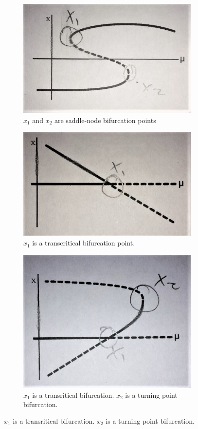 \documentclass[12pt,a4paper]{article}
\begin{document}
\begin{figure}[H]
\centering
\begin{subfigure}{.3\textwidth}
    \centering
    \includegraphics[width=.8\linewidth]{q3-a}
    \caption{$x_1$ and $x_2$ are saddle-node bifurcation points}
\end{subfigure}
\begin{subfigure}{.3\textwidth}
    \centering
    \includegraphics[width=.8\linewidth]{q3-b}
    \caption{$x_1$ is a transcritical bifurcation point.}
\end{subfigure}
\begin{subfigure}{.3\textwidth}
    \centering
    \includegraphics[width=.8\linewidth]{q3-c}
    \caption{$x_1$ is a transritical bifurcation. $x_2$ is a turning point bifurcation.}
\end{subfigure}
\end{figure}
\end{document}
